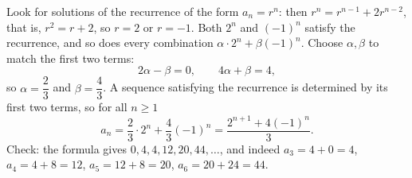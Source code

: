 Look for solutions of the recurrence of the form $a_n=r^n$: then $r^n=r^{n-1}+2r^{n-2}$, that is, $r^2=r+2$, so $r=2$ or $r=-1$. Both $2^n$ and $(-1)^n$ satisfy the recurrence, and so does every combination $\alpha\cdot2^n+\beta(-1)^n$. Choose $\alpha,\beta$ to match the first two terms:
\[2\alpha-\beta=0,\qquad4\alpha+\beta=4,\]
so $\alpha=\dfrac23$ and $\beta=\dfrac43$. A sequence satisfying the recurrence is determined by its first two terms, so for all $n\ge1$
\[a_n=\dfrac23\cdot2^n+\dfrac43(-1)^n=\boxed{\dfrac{2^{n+1}+4(-1)^n}{3}}.\]
Check: the formula gives $0,4,4,12,20,44,\dots$, and indeed $a_3=4+0=4$, $a_4=4+8=12$, $a_5=12+8=20$, $a_6=20+24=44$.
